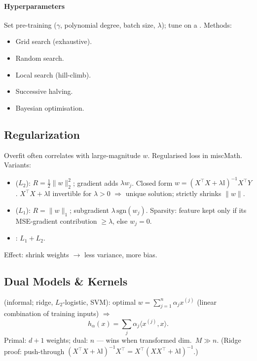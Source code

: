 \paragraph{Hyperparameters} Set pre-training ($\gamma$, polynomial degree, batch size, $\lambda$); tune on a . Methods:
\begin{itemize}
\item Grid search (exhaustive).
\item Random search.
\item Local search (hill-climb).
\item Successive halving.
\item Bayesian optimisation.
\end{itemize}

\subsection{Regularization}
Overfit often correlates with large-magnitude $w$. Regularised loss in miscMath. Variants:
\begin{itemize}
\item {} ($L_2$): $R{=}\tfrac12\|w\|_2^2$; gradient adds $\lambda w_j$. Closed form $w{=}(X^{\top}X{+}\lambda\mathbb{I})^{-1}X^{\top}Y$. $X^{\top}X{+}\lambda\mathbb{I}$ invertible for $\lambda{>}0$ $\Rightarrow$ unique solution; strictly shrinks $\|w\|$.
\item {} ($L_1$): $R{=}\|w\|_1$; subgradient $\lambda\,\mathrm{sgn}(w_j)$. Sparsity: feature kept only if its MSE-gradient contribution $\geq\lambda$, else $w_j{=}0$.
\item {}: $L_1{+}L_2$.
\end{itemize}
Effect: shrink weights $\to$ less variance, more bias.

\subsection{Dual Models \& Kernels}
 (informal; ridge, $L_2$-logistic, SVM): optimal $w{=}\sum_{j=1}^{n}\alpha_j x^{(j)}$ (linear combination of training inputs) $\Rightarrow$ 
\[h_\alpha(x)=\sum_j\alpha_j\langle x^{(j)},x\rangle.\]
Primal: $d{+}1$ weights; dual: $n$ — wins when transformed dim.\ $M\!\gg\!n$. (Ridge proof: push-through $(X^{\top}X{+}\lambda\mathbb{I})^{-1}X^{\top}{=}X^{\top}(XX^{\top}{+}\lambda\mathbb{I})^{-1}$.)
